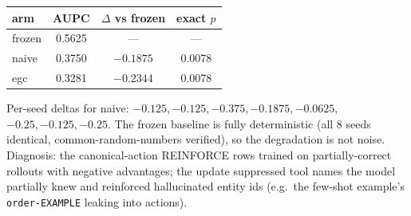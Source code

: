 \begin{center}
\begin{tabular}{lccc}
\toprule
arm & AUPC & $\Delta$ vs frozen & exact $p$ \\
\midrule
frozen & 0.5625 & --- & --- \\
naive  & 0.3750 & $-0.1875$ & 0.0078 \\
egc    & 0.3281 & $-0.2344$ & 0.0078 \\
\bottomrule
\end{tabular}
\end{center}

Per-seed deltas for naive: $-0.125,-0.125,-0.375,-0.1875,-0.0625,$
$-0.25,-0.125,-0.25$. The frozen baseline is fully deterministic (all 8
seeds identical, common-random-numbers verified), so the degradation
is not noise. Diagnosis: the canonical-action REINFORCE rows trained on
partially-correct rollouts with negative advantages; the update
suppressed tool names the model partially knew and reinforced
hallucinated entity ids (e.g.\ the few-shot example's
\texttt{order-EXAMPLE} leaking into actions).

